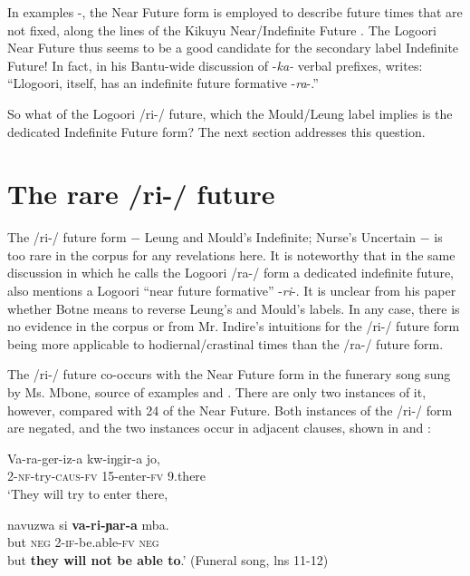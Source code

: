 \documentclass[output=paper]{langsci/langscibook}
\begin{document}
In examples -, the Near Future form is employed to describe future times that are not fixed, along the lines of the Kikuyu Near/Indefinite Future \citep[20]{Johnson1977}. The Logoori Near Future thus seems to be a good candidate for the secondary label Indefinite Future! In fact, in his Bantu-wide discussion of -\textit{ka-} verbal prefixes, \citet[492]{Botne1999} writes: “Llogoori, itself, has an indefinite future formative -\textit{ra}-.” 

So what of the Logoori /ri-/ future, which the Mould/Leung label implies is the dedicated Indefinite Future form? The next section addresses this question.

\section[The rare /ri-/ future]{The rare /ri-/ future}
\label{sec:sarvasy:4}

The /ri-/ future form $-$ Leung and Mould’s Indefinite; Nurse’s Uncertain $-$ is too rare in the corpus for any revelations here. It is noteworthy that in the same discussion in which he calls the Logoori /ra-/ form a dedicated indefinite future, \citet[491]{Botne1999} also mentions a Logoori “near future formative” -\textit{ri}-. It is unclear from his paper whether Botne means to reverse Leung’s and Mould’s labels. In any case, there is no evidence in the corpus or from Mr. Indire’s intuitions for the /ri-/ future form being more applicable to hodiernal/crastinal times than the /ra-/ future form.

The /ri-/ future co-occurs with the Near Future form in the funerary song sung by Ms. Mbone, source of examples  and . There are only two instances of it, however, compared with 24 of the Near Future. Both instances of the /ri-/ form are negated, and the two instances occur in adjacent clauses, shown in  and :

\ea\label{ex:sarvasy:9}
\gll Va-ra-ger-iz-a     kw-iŋgir-a   jo,\\ 
2-\textsc{nf}-try\textsc{-caus-fv}  15-enter-\textsc{fv}  9.there\\ 
\glt ‘They will try to enter there,

\gll navuzwa   si   \textbf{va-ri-ɲar-a}     mba. \\
but    \textsc{neg}  2-\textsc{if-}be.able-\textsc{fv}  \textsc{neg} \\
\glt but \textbf{they will not be able to}.’ (Funeral song, lns 11-12)
\z
\end{document}
